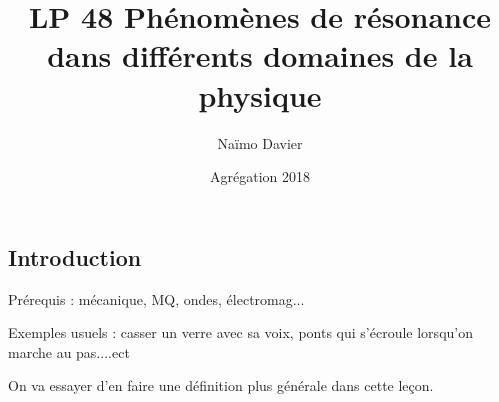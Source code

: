 \documentclass[12pt,prb,aps,epsf]{article}
\begin{document}
	
	\title{LP 48 Phénomènes de résonance dans différents domaines de la physique}
	\author{Naïmo Davier}
	\date{Agrégation 2018}
	
	\maketitle
	
	\tableofcontents
	
	\pagebreak
	
\subsection{Introduction}
Prérequis : mécanique, MQ, ondes, électromag...

Exemples usuels : casser un verre avec sa voix, ponts qui s'écroule lorsqu'on marche au pas....ect

On va essayer d'en faire une définition plus générale dans cette leçon.
\end{document}
